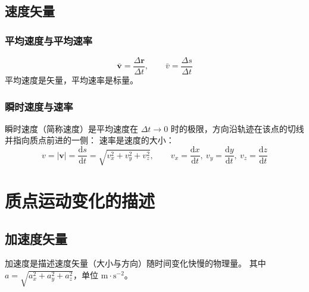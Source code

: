     \subsection{速度矢量}
        \subsubsection{平均速度与平均速率}
        \[
        \bar{\boldsymbol{v}}=\frac{\Delta\boldsymbol{r}}{\Delta t},\qquad
        \bar{v}=\frac{\Delta s}{\Delta t}
        \]
        平均速度是矢量，平均速率是标量。

        \subsubsection{瞬时速度与速率}
        瞬时速度（简称速度）是平均速度在 $\Delta t\to0$ 时的极限，方向沿轨迹在该点的切线并指向质点前进的一侧：
        速率是速度的大小：
        \[
        v=|\boldsymbol{v}|=\frac{\mathrm{d}s}{\mathrm{d}t}=\sqrt{v_{x}^{2}+v_{y}^{2}+v_{z}^{2}},
        \qquad v_{x}=\frac{\mathrm{d}x}{\mathrm{d}t},\ v_{y}=\frac{\mathrm{d}y}{\mathrm{d}t},\ v_{z}=\frac{\mathrm{d}z}{\mathrm{d}t}
        \]

\section{质点运动变化的描述}
    \subsection{加速度矢量}
    加速度是描述速度矢量（大小与方向）随时间变化快慢的物理量。
    其中 $a=\sqrt{a_{x}^{2}+a_{y}^{2}+a_{z}^{2}}$，单位 $\mathrm{m\cdot s^{-2}}$。

